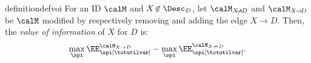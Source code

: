 \begin{restatable}{definition}{defvoi}
For an ID $\calM$ and $X \!\not \in \Desc_D$,
let $\calM_{X \!\not\! \to\! D}$ and $\calM_{X \!\to\! D}$ be
$\calM$ modified by respectively removing and adding the edge $X \!\to\! D$.
Then, the \emph{value of information} of $X$ for $D$ is:~ 
\[
\max_\spi \EE^{\calM_{X \to D}}_\spi[\totutilvar]
-
\max_\spi \EE^{\calM_{X \not \to D}}_\spi[\totutilvar]
.\]
\end{restatable}